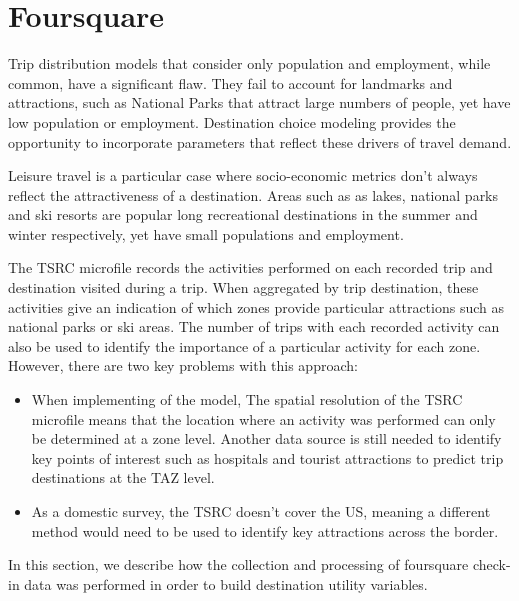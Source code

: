 \section{Foursquare}
\label{section:data-foursquare}
Trip distribution models that consider only population and employment, while common, have a significant flaw. They fail to account for landmarks and attractions, such as National Parks that attract large numbers of people, yet have low population or employment. Destination choice modeling provides the opportunity to incorporate parameters that reflect these drivers of travel demand. 
	
Leisure travel is a particular case where socio-economic metrics don't always reflect the attractiveness of a destination. Areas such as as lakes, national parks and ski resorts are popular long recreational destinations in the summer and winter respectively, yet have small populations and employment. 
	
The TSRC microfile records the activities performed on each recorded trip and destination visited during a trip. When aggregated by trip destination, these activities give an indication of which zones provide particular attractions such as national parks or ski areas. The number of trips with each recorded activity can also be used to identify the importance of a particular activity for each zone. However, there are two key problems with this approach:

\begin{itemize}
\item When implementing of the model,  The spatial resolution of the TSRC microfile means that the location where an activity was performed can only be determined at a zone level. Another data source is still needed to identify key points of interest such as hospitals and tourist attractions to predict trip destinations at the TAZ level.
\item As a domestic survey, the TSRC doesn't cover the US, meaning a different method would need to be used to identify key attractions across the border.
\end{itemize}	
In this section, we describe how the collection and processing of foursquare check-in data was performed in order to build destination utility variables.

